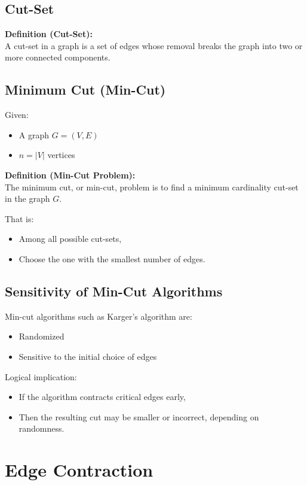 \documentclass[12pt]{article}
\begin{document}
\subsection{Cut-Set}

\textbf{Definition (Cut-Set):} \\
A cut-set in a graph is a set of edges whose removal breaks the graph into two or more connected components.

\subsection{Minimum Cut (Min-Cut)}

Given:
\begin{itemize}
    \item A graph $G = (V, E)$
    \item $n = |V|$ vertices
\end{itemize}

\textbf{Definition (Min-Cut Problem):} \\
The minimum cut, or min-cut, problem is to find a minimum cardinality cut-set in the graph $G$.

That is:
\begin{itemize}
    \item Among all possible cut-sets,
    \item Choose the one with the smallest number of edges.
\end{itemize}

\subsection{Sensitivity of Min-Cut Algorithms}

Min-cut algorithms such as Karger’s algorithm are:
\begin{itemize}
    \item Randomized
    \item Sensitive to the initial choice of edges
\end{itemize}

Logical implication:
\begin{itemize}
    \item If the algorithm contracts critical edges early,
    \item Then the resulting cut may be smaller or incorrect, depending on randomness.
\end{itemize}

\section{Edge Contraction}
\end{document}
